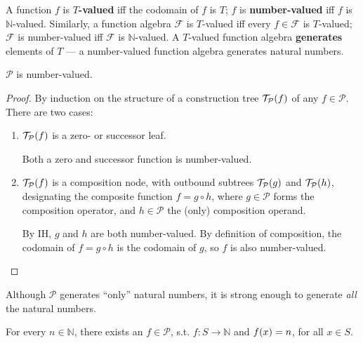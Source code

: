\begin{definition} A function $f$ is \textbf{$T$-valued} iff the codomain of
$f$ is $T$; $f$ is \textbf{number-valued} iff $f$ is $\mathbb{N}$-valued.
Similarly, a function algebra $\mathcal{F}$ is $T$-valued iff every $f \in
\mathcal{F}$ is $T$-valued; $\mathcal{F}$ is number-valued iff $\mathcal{F}$ is
$\mathbb{N}$-valued. A $T$-valued function algebra \textbf{generates} elements
of $T$ --- a number-valued function algebra generates natural numbers.
 
 \end{definition}

\begin{theorem} \label{thm:p-number-valued} $\mathcal{P}$ is number-valued.
\end{theorem}

\begin{proof} By induction on the structure of a construction tree
$\mathcal{T}_\mathcal{P}{\mathopen{}\left({f}\right)\mathclose{}}$ of any $f\in \mathcal{P}$. There are two
cases:\begin{enumerate}[label=(\arabic*)]

\item $\mathcal{T}_\mathcal{P}{\mathopen{}\left({f}\right)\mathclose{}}$ is a zero- or successor leaf.

Both a zero and successor function is number-valued.

\item $\mathcal{T}_\mathcal{P}{\mathopen{}\left({f}\right)\mathclose{}}$ is a composition node, with outbound
subtrees $\mathcal{T}_\mathcal{P}{\mathopen{}\left({g}\right)\mathclose{}}$ and $\mathcal{T}_\mathcal{P}{\mathopen{}\left({h}\right)\mathclose{}}$,
designating the composite function $f = g \circ h$, where $g \in \mathcal{P}$
forms the composition operator, and $h \in \mathcal{P}$ the (only) composition
operand.

By IH, $g$ and $h$ are both number-valued. By definition of composition, the
codomain of $f = g \circ h$ is the codomain of $g$, so $f$ is also
number-valued.\end{enumerate}\end{proof}

Although $\mathcal{P}$ generates ``only'' natural numbers, it is strong enough
to generate \emph{all} the natural numbers.

\begin{theorem} \label{thm:p-generates-all-N} For every $n \in \mathbb{N}$,
there exists an $f \in \mathcal{P}$, s.t. $f : S \rightarrow \mathbb{N}$ and
$f{\mathopen{}\left({x}\right)\mathclose{}} = n$, for all $x \in S$. \end{theorem}

